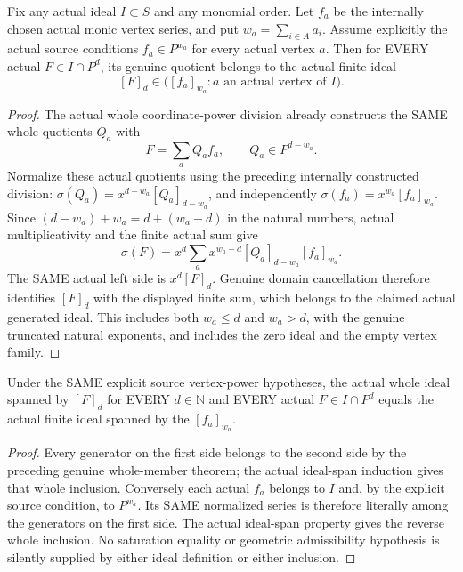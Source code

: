 \begin{theorem}
\label{hir:actual-formal-blowup-normalized-original-member-generation}
Fix any actual ideal $I\subset S$ and any monomial order. Let $f_a$ be
the internally chosen actual monic vertex series, and put
$w_a=\sum_{i\in A}a_i$. Assume explicitly the actual source conditions
$f_a\in P^{w_a}$ for every actual vertex $a$. Then for EVERY actual
$F\in I\cap P^d$, its genuine quotient belongs to the actual finite ideal
\[
 [F]_d\in\bigl([f_a]_{w_a}:a\text{ an actual vertex of }I\bigr).
\]
\leanok
\end{theorem}
\begin{proof}
The actual whole coordinate-power division already constructs the SAME
whole quotients $Q_a$ with
\[
 F=\sum_a Q_af_a,\qquad Q_a\in P^{d-w_a}.
\]
Normalize these actual quotients using the preceding internally constructed
division: $\sigma(Q_a)=x^{d-w_a}[Q_a]_{d-w_a}$, and independently
$\sigma(f_a)=x^{w_a}[f_a]_{w_a}$. Since
$(d-w_a)+w_a=d+(w_a-d)$ in the natural numbers, actual multiplicativity
and the finite actual sum give
\[
 \sigma(F)=x^d\sum_a
 x^{w_a-d}[Q_a]_{d-w_a}[f_a]_{w_a}.
\]
The SAME actual left side is $x^d[F]_d$. Genuine domain cancellation
therefore identifies $[F]_d$ with the displayed finite sum, which belongs
to the claimed actual generated ideal. This includes both $w_a\le d$
and $w_a>d$, with the genuine truncated natural exponents, and includes
the zero ideal and the empty vertex family.
\end{proof}

\begin{theorem}
\label{hir:actual-formal-blowup-whole-normalized-member-ideal}
Under the SAME explicit source vertex-power hypotheses, the actual whole
ideal spanned by $[F]_d$ for EVERY $d\in\mathbb N$ and EVERY actual
$F\in I\cap P^d$ equals the actual finite ideal spanned by the
$[f_a]_{w_a}$.
\leanok
\end{theorem}
\begin{proof}
Every generator on the first side belongs to the second side by the
preceding genuine whole-member theorem; the actual ideal-span induction
gives that whole inclusion. Conversely each actual $f_a$ belongs to $I$
and, by the explicit source condition, to $P^{w_a}$. Its SAME normalized
series is therefore literally among the generators on the first side.
The actual ideal-span property gives the reverse whole inclusion.
No saturation equality or geometric admissibility hypothesis is silently
supplied by either ideal definition or either inclusion.
\end{proof}
